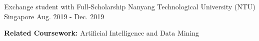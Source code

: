 \begin{cventries}
{\begin{cvitems}
      \end{cvitems}
    }
\cvopenentry
    {Exchange student with Full-Scholarship}
    {Nanyang Technological University (NTU)} %
    {Singapore} %
    {Aug. 2019 - Dec. 2019} %
    {\begin{cvitems} %
        \item {\textbf{Related Coursework:} Artificial Intelligence and Data Mining}
      \end{cvitems}
    }
   
\end{cventries}
